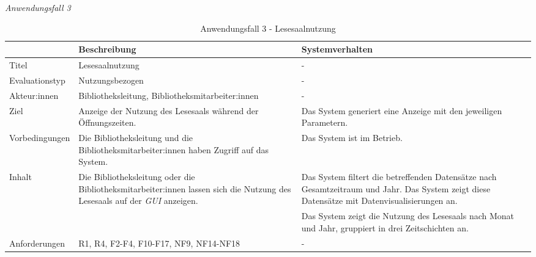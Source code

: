 \newpage
\noindent
\textit{Anwendungsfall 3}

\begingroup
\setlength{\tabcolsep}{10pt} %
\renewcommand{\arraystretch}{1.25} 
\begin{table}[h]
    \centering
    \begin{adjustbox}{max width=\textwidth}
    \begin{tabular}{lp{7.0cm}p{7.0cm}}
       \toprule
       \textbf{}          & \textbf{Beschreibung} &\textbf{Systemverhalten}\\
       \midrule
        Titel                            &Lesesaalnutzung& -\\
        Evaluationstyp                   &Nutzungsbezogen                   & -\\
        Akteur:innen                     &Bibliotheksleitung, Bibliotheksmitarbeiter:innen& -\\
        Ziel                             &Anzeige der Nutzung des Lesesaals während der Öffnungszeiten.& Das System generiert eine Anzeige mit den jeweiligen Parametern.\\
        Vorbedingungen                   &Die Bibliotheksleitung und die Bibliotheksmitarbeiter:innen haben Zugriff auf das System.& Das System ist im Betrieb.\\
        Inhalt                          &Die Bibliotheksleitung oder die Bibliotheksmitarbeiter:innen lassen sich die Nutzung des Lesesaals auf der \textit{\acrshort{GUI}} anzeigen. & Das System filtert die betreffenden Datensätze nach Gesamtzeitraum und Jahr. Das System zeigt diese Datensätze mit Datenvisualisierungen an.\\
                                         & &Das System zeigt die Nutzung des Lesesaals nach Monat und Jahr, gruppiert in drei Zeitschichten an.\\

        Anforderungen                   &R1, R4, F2-F4, F10-F17, NF9, NF14-NF18& -\\
        \bottomrule
    \end{tabular}
    \end{adjustbox}
    \caption{%
    Anwendungsfall 3 - Lesesaalnutzung    }
    \label{tab:AF_Lesesaalnutzung}
    \end{table}
\endgroup


